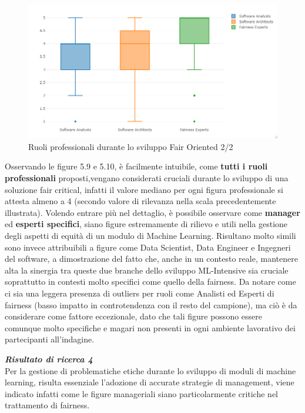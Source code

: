      \begin{figure}[h!]
        \centering
        \includegraphics[width=1\textwidth]{figure/Analisi/RQ2/RoleImpactBoxPlot2.png}
        \caption{Ruoli professionali durante lo sviluppo Fair Oriented 2/2}
    \end{figure}
	 
	 
	 Osservando le figure 5.9 e 5.10, è facilmente intuibile, come \textbf{tutti i ruoli professionali} proposti,vengano considerati cruciali durante lo sviluppo di una soluzione fair critical, infatti il valore mediano per ogni figura professionale si attesta almeno a 4 (secondo valore di rilevanza nella scala precedentemente illustrata). Volendo entrare più nel dettaglio, è possibile osservare come \textbf{manager} ed \textbf{esperti specifici}, siano figure estremamente di rilievo e utili nella gestione degli aspetti di equità di un modulo di Machine Learning. Risultano molto simili sono invece attribuibili a figure come Data Scientist, Data Engineer e Ingegneri del software, a dimostrazione del fatto che, anche in un contesto reale, mantenere alta la sinergia tra queste due branche dello sviluppo ML-Intensive sia cruciale soprattutto in contesti molto specifici come quello della fairness. Da notare come ci sia una leggera presenza di outliers per ruoli come Analisti ed Esperti di fairness (basso impatto in controtendenza con il resto del campione), ma ciò è da considerare come fattore eccezionale, dato che tali figure possono essere comunque molto specifiche e magari non presenti in ogni ambiente lavorativo dei partecipanti all'indagine.
	 
	 
	 \begin{center}
	
        \begin{tcolorbox}[width=\textwidth, colframe=black, colback=Gray]
    			\begin{minipage}{\textwidth}
    				\textit{\faKey  \textbf{ Risultato di ricerca 4}}\\
    			 Per la gestione di problematiche etiche durante lo sviluppo di moduli di machine learning, risulta essenziale l'adozione di accurate strategie di management, viene indicato infatti come le figure manageriali siano particolarmente critiche nel trattamento di fairness.
    			\end{minipage}
		\end{tcolorbox}
	\end{center}
	
